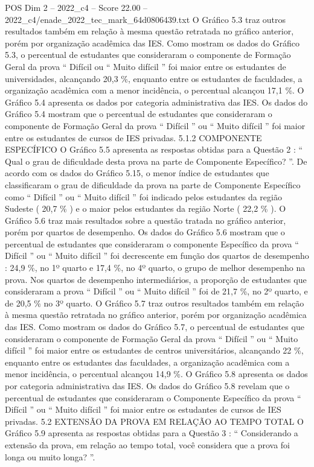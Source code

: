 \begin{textsample}{POS Dim 2 – 2022\_c4 – Score 22.00 – 2022\_c4/enade\_2022\_tec\_mark\_64d0806439.txt}
O Gráfico 5.3 traz outros resultados também em relação à mesma questão retratada no gráfico anterior, porém por organização acadêmica das IES.
Como mostram os dados do Gráfico 5.3, o percentual de estudantes que consideraram o componente de Formação Geral da prova “ Difícil ou “ Muito difícil ” foi maior entre os estudantes de universidades, alcançando 20,3 \%, enquanto entre os estudantes de faculdades, a organização acadêmica com a menor incidência, o percentual alcançou 17,1 \%.
O Gráfico 5.4 apresenta os dados por categoria administrativa das IES.
Os dados do Gráfico 5.4 mostram que o percentual de estudantes que consideraram o componente de Formação Geral da prova “ Difícil ” ou “ Muito difícil ” foi maior entre os estudantes de cursos de IES privadas. 5.1.2 COMPONENTE ESPECÍFICO O Gráfico 5.5 apresenta as respostas obtidas para a Questão 2 : “ Qual o grau de dificuldade desta prova na parte de Componente Específico? ”.
De acordo com os dados do Gráfico 5.15, o menor índice de estudantes que classificaram o grau de dificuldade da prova na parte de Componente Específico como “ Difícil ” ou “ Muito difícil ” foi indicado pelos estudantes da região Sudeste ( 20,7 \% ) e o maior pelos estudantes da região Norte ( 22,2 \% ).
O Gráfico 5.6 traz mais resultados sobre a questão tratada no gráfico anterior, porém por quartos de desempenho.
Os dados do Gráfico 5.6 mostram que o percentual de estudantes que consideraram o componente Específico da prova “ Difícil ” ou “ Muito difícil ” foi decrescente em função dos quartos de desempenho : 24,9 \%, no 1º quarto e 17,4 \%, no 4º quarto, o grupo de melhor desempenho na prova.
Nos quartos de desempenho intermediários, a proporção de estudantes que consideraram a prova “ Difícil ” ou “ Muito difícil ” foi de 21,7 \%, no 2º quarto, e de 20,5 \% no 3º quarto.
O Gráfico 5.7 traz outros resultados também em relação à mesma questão retratada no gráfico anterior, porém por organização acadêmica das IES.
Como mostram os dados do Gráfico 5.7, o percentual de estudantes que consideraram o componente de Formação Geral da prova “ Difícil ” ou “ Muito difícil ” foi maior entre os estudantes de centros universitários, alcançando 22 \%, enquanto entre os estudantes das faculdades, a organização acadêmica com a menor incidência, o percentual alcançou 14,9 \%.
O Gráfico 5.8 apresenta os dados por categoria administrativa das IES.
Os dados do Gráfico 5.8 revelam que o percentual de estudantes que consideraram o Componente Específico da prova “ Difícil ” ou “ Muito difícil ” foi maior entre os estudantes de cursos de IES privadas. 5.2 EXTENSÃO DA PROVA EM RELAÇÃO AO TEMPO TOTAL O Gráfico 5.9 apresenta as respostas obtidas para a Questão 3 : “ Considerando a extensão da prova, em relação ao tempo total, você considera que a prova foi longa ou muito longa? ”.

\end{textsample}
